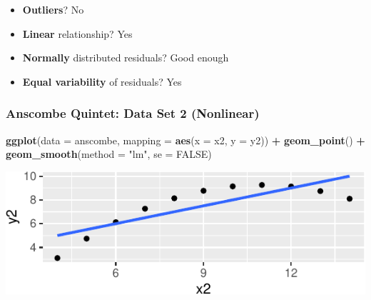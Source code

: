 \documentclass[14pt]{extarticle}
\newenvironment{Shaded}{\begin{snugshade}}{\end{snugshade}}
\newcommand{\KeywordTok}[1]{\textcolor[rgb]{0.13,0.29,0.53}{\textbf{#1}}}
\newcommand{\DataTypeTok}[1]{\textcolor[rgb]{0.13,0.29,0.53}{#1}}
\newcommand{\StringTok}[1]{\textcolor[rgb]{0.31,0.60,0.02}{#1}}
\newcommand{\OtherTok}[1]{\textcolor[rgb]{0.56,0.35,0.01}{#1}}
\newcommand{\OperatorTok}[1]{\textcolor[rgb]{0.81,0.36,0.00}{\textbf{#1}}}
\newcommand{\NormalTok}[1]{#1}
\begin{document}
\begin{itemize}
\item
  \textbf{Outliers}? No
\item
  \textbf{Linear} relationship? Yes
\item
  \textbf{Normally} distributed residuals? Good enough
\item
  \textbf{Equal variability} of residuals? Yes
\end{itemize}

\subsubsection{Anscombe Quintet: Data Set 2
(Nonlinear)}\label{anscombe-quintet-data-set-2-nonlinear}

\begin{Shaded}
\begin{Highlighting}[]
\KeywordTok{ggplot}\NormalTok{(}\DataTypeTok{data =}\NormalTok{ anscombe, }\DataTypeTok{mapping =} \KeywordTok{aes}\NormalTok{(}\DataTypeTok{x =}\NormalTok{ x2, }\DataTypeTok{y =}\NormalTok{ y2)) }\OperatorTok{+}
\StringTok{  }\KeywordTok{geom_point}\NormalTok{() }\OperatorTok{+}
\StringTok{  }\KeywordTok{geom_smooth}\NormalTok{(}\DataTypeTok{method =} \StringTok{"lm"}\NormalTok{, }\DataTypeTok{se =} \OtherTok{FALSE}\NormalTok{)}
\end{Highlighting}
\end{Shaded}

\includegraphics{20181112_anscombe_residuals_files/figure-latex/unnamed-chunk-6-1.pdf}

\begin{Shaded}
\end{Shaded}
\end{document}
